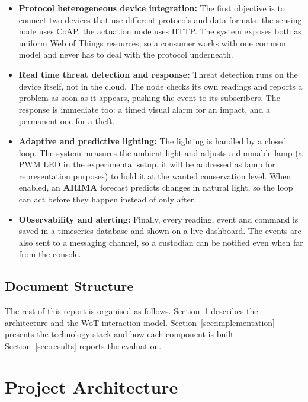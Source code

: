 \documentclass[conference]{IEEEtran}
\begin{document}
\begin{itemize}
\item \textbf{Protocol heterogeneous device integration:}
The first objective is to connect two devices that use different protocols and data formats: the sensing node uses CoAP, the actuation node uses HTTP. The system exposes both as uniform Web of Things resources, so a consumer works with one common model and never has to deal with the protocol underneath.

\item \textbf{Real time threat detection and response:}
Threat detection runs on the device itself, not in the cloud. The node checks its own readings and reports a problem as soon as it appears, pushing the event to its subscribers. The response is immediate too: a timed visual alarm for an impact, and a permanent one for a theft.

\item \textbf{Adaptive and predictive lighting:}
The lighting is handled by a closed loop. The system measures the ambient light and adjusts a dimmable lamp (a PWM LED in the experimental setup, it will be addressed as lamp for representation purposes) to hold it at the wanted conservation level. When enabled, an \textbf{ARIMA} forecast predicts changes in natural light, so the loop can act before they happen instead of only after.

\item \textbf{Observability and alerting:}
Finally, every reading, event and command is saved in a timeseries database and shown on a live dashboard. The events are also sent to a messaging channel, so a custodian can be notified even when far from the console.

\end{itemize}

\subsection{Document Structure}
The rest of this report is organised as follows. Section~\ref{sec:architecture} describes the architecture and the WoT interaction model. Section~\ref{sec:implementation} presents the technology stack and how each component is built. Section~\ref{sec:results} reports the evaluation.

\section{Project Architecture}
\label{sec:architecture}
\end{document}
